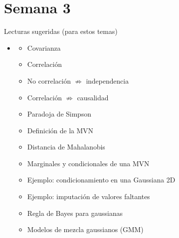 \part{Semana 3}

\begin{frame}
  \titlepage
\end{frame}

\begin{frame}{Lecturas sugeridas (para estos temas)}
\begin{itemize}
  \item {}
  \begin{itemize}
    \item {} Covarianza
    \item {} Correlación
    \item {} No correlación \(\not\Rightarrow\) independencia
    \item {} Correlación \(\not\Rightarrow\) causalidad
    \item {} Paradoja de Simpson
    \item {} Definición de la MVN
    \item {} Distancia de Mahalanobis
    \item {} Marginales y condicionales de una MVN \key{*}
    \item {} Ejemplo: condicionamiento en una Gaussiana 2D
    \item {} Ejemplo: imputación de valores faltantes \key{*}
    \item {} Regla de Bayes para gaussianas
    \item {} Modelos de mezcla gaussianos (GMM)
  \end{itemize}
\end{itemize}
\end{frame}

